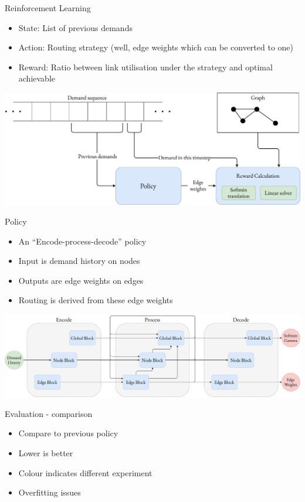 \documentclass{beamer}
\begin{document}
\begin{frame}{Reinforcement Learning}
  \begin{itemize}
    \item State: List of previous demands
    \item Action: Routing strategy (well, edge weights which can be converted to one)
    \item Reward: Ratio between link utilisation under the strategy and optimal achievable
  \end{itemize}
  \includegraphics[width=\textwidth]{figures/environment.pdf}
\end{frame}

\begin{frame}{Policy}
  \begin{itemize}
    \item An ``Encode-process-decode''\cite{battaglia2018relational} policy
    \item Input is demand history on nodes
    \item Outputs are edge weights on edges
    \item Routing is derived from these edge weights
  \end{itemize}
  \vspace{2em}
  \includegraphics[width=\textwidth]{figures/encode_process_decode.pdf}
\end{frame}

\begin{frame}{Evaluation - comparison}
  \begin{itemize}
    \item Compare to previous policy
    \item Lower is better
    \item Colour indicates different experiment
    \item Overfitting issues
  \end{itemize}
  \centering
  \resizebox{0.7\textwidth}{!}{}
\end{frame}
\end{document}
